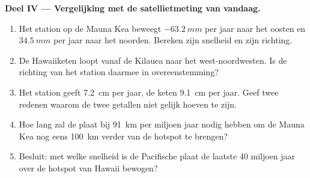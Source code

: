 \begin{problem}
\medskip
\noindent\textbf{Deel IV --- Vergelijking met de satellietmeting van vandaag.}
\begin{enumerate}[resume]
  \item Het station op de Mauna Kea beweegt $\qty{-63.2}{mm}$ per jaar naar het oosten en
        $\qty{+34.5}{mm}$ per jaar naar het noorden. Bereken zijn snelheid en zijn richting.
  \item De Hawaiiketen loopt vanaf de Kilauea naar het west-noordwesten. Is
        de richting van het station daarmee in overeenstemming?
  \item Het station geeft \qty{7.2}{cm} per jaar, de keten \qty{9.1}{cm} per jaar.
        Geef twee redenen waarom de twee getallen niet gelijk hoeven te zijn.
  \item Hoe lang zal de plaat bij \qty{91}{km} per miljoen jaar nodig hebben om de
        Mauna Kea nog eens \qty{100}{km} verder van de hotspot te brengen?
  \item Besluit: met welke snelheid is de Pacifische plaat de laatste 40 miljoen
        jaar over de hotspot van Hawaii bewogen?
\end{enumerate}
\end{problem}
